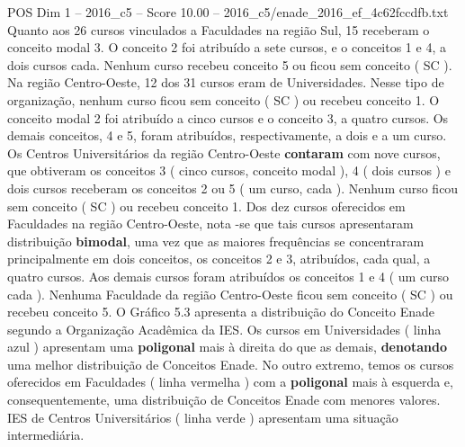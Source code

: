 \begin{textsample}{POS Dim 1 – 2016\_c5 – Score 10.00 – 2016\_c5/enade\_2016\_ef\_4c62fccdfb.txt}
Quanto aos 26 cursos vinculados a Faculdades na região Sul, 15 receberam o conceito modal 3.
O conceito 2 foi atribuído a sete cursos, e o conceitos 1 e 4, a dois cursos cada.
Nenhum curso recebeu conceito 5 ou ficou sem conceito ( SC ).
Na região Centro-Oeste, 12 dos 31 cursos eram de Universidades.
Nesse tipo de organização, nenhum curso ficou sem conceito ( SC ) ou recebeu conceito 1.
O conceito modal 2 foi atribuído a cinco cursos e o conceito 3, a quatro cursos.
Os demais conceitos, 4 e 5, foram atribuídos, respectivamente, a dois e a um curso.
Os Centros Universitários da região Centro-Oeste \textbf{contaram} com nove cursos, que obtiveram os conceitos 3 ( cinco cursos, conceito modal ), 4 ( dois cursos ) e dois cursos receberam os conceitos 2 ou 5 ( um curso, cada ).
Nenhum curso ficou sem conceito ( SC ) ou recebeu conceito 1.
Dos dez cursos oferecidos em Faculdades na região Centro-Oeste, nota -se que tais cursos apresentaram distribuição \textbf{bimodal}, uma vez que as maiores frequências se concentraram principalmente em dois conceitos, os conceitos 2 e 3, atribuídos, cada qual, a quatro cursos.
Aos demais cursos foram atribuídos os conceitos 1 e 4 ( um curso cada ).
Nenhuma Faculdade da região Centro-Oeste ficou sem conceito ( SC ) ou recebeu conceito 5.
O Gráfico 5.3 apresenta a distribuição do Conceito Enade segundo a Organização Acadêmica da IES.
Os cursos em Universidades ( linha azul ) apresentam uma \textbf{poligonal} mais à direita do que as demais, \textbf{denotando} uma melhor distribuição de Conceitos Enade.
No outro extremo, temos os cursos oferecidos em Faculdades ( linha vermelha ) com a \textbf{poligonal} mais à esquerda e, consequentemente, uma distribuição de Conceitos Enade com menores valores.
IES de Centros Universitários ( linha verde ) apresentam uma situação intermediária.

\end{textsample}

